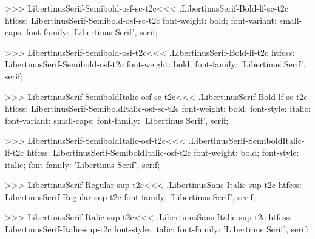{{{{{{{{{{{{{{{{>>>
\<LibertinusSerif-Semibold-osf-sc-t2c\><<<
.LibertinusSerif-Bold-lf-sc-t2c
htfcss:  LibertinusSerif-Semibold-osf-sc-t2c  font-weight: bold; font-variant: small-caps; font-family: 'Libertinus Serif', serif;

>>>
\<LibertinusSerif-Semibold-osf-t2c\><<<
.LibertinusSerif-Bold-lf-t2c
htfcss:  LibertinusSerif-Semibold-osf-t2c  font-weight: bold; font-family: 'Libertinus Serif', serif;

>>>
\<LibertinusSerif-SemiboldItalic-osf-sc-t2c\><<<
.LibertinusSerif-Bold-lf-sc-t2c
htfcss:  LibertinusSerif-SemiboldItalic-osf-sc-t2c  font-weight: bold; font-style: italic; font-variant: small-caps; font-family: 'Libertinus Serif', serif;

>>>
\<LibertinusSerif-SemiboldItalic-osf-t2c\><<<
.LibertinusSerif-SemiboldItalic-lf-t2c
htfcss:  LibertinusSerif-SemiboldItalic-osf-t2c  font-weight: bold; font-style: italic; font-family: 'Libertinus Serif', serif;

>>>
\<LibertinusSerif-Regular-sup-t2c\><<<
.LibertinusSans-Italic-sup-t2c
htfcss:  LibertinusSerif-Regular-sup-t2c  font-family: 'Libertinus Serif', serif;

>>>
\<LibertinusSerif-Italic-sup-t2c\><<<
.LibertinusSans-Italic-sup-t2c
htfcss:  LibertinusSerif-Italic-sup-t2c  font-style: italic; font-family: 'Libertinus Serif', serif;

}}}}}}}}}}}}}}}}
